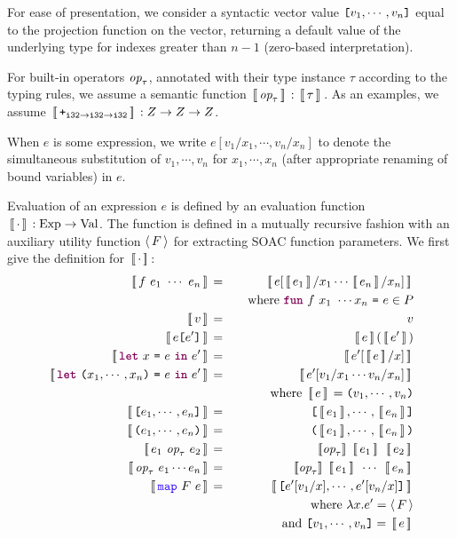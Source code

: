 \documentclass[11pt]{book}
\begin{document}
For ease of presentation, we consider a syntactic vector value $\texttt{[}v_1,\cdots,v_n\texttt{]}$ equal to the projection function on the vector, returning a default value of the underlying type for indexes greater than $n-1$ (zero-based interpretation).

For built-in operators $\mbox{\it{op}}_\tau$, annotated with their type
instance $\tau$ according to the typing rules, we assume a semantic
function $\,[\![\,\mbox{\it{op}}_\tau\,]\!]\, : \,[\![\,\tau\,]\!]\,$. As an examples, we assume
$\,[\![\,\texttt{+}_{\texttt{i32}\rightarrow\texttt{i32}\rightarrow\texttt{i32}}\,]\!]\, : Z \rightarrow Z \rightarrow Z$.

When $e$ is some expression, we write $e[v_1/x_1,\cdots,v_n/x_n]$ to
denote the simultaneous substitution of $v_1,\cdots,v_n$ for
$x_1,\cdots,x_n$ (after appropriate renaming of bound variables) in
$e$.



Evaluation of an expression $e$ is defined by an evaluation function
$\,[\![\,\cdot\,]\!]\, : \mathrm{Exp} \rightarrow \mathrm{Val}$. The function
is defined in a mutually recursive fashion with an auxiliary utility
function $\langle\,F\,\rangle$ for extracting SOAC function parameters. We
first give the definition for $\,[\![\,\cdot\,]\!]\,$:
\begin{eqnarray*}
  \Eval{f~e_1~\cdots~e_n} & = & \Eval{e[\Eval{e_1}/x_1\cdots \Eval{e_n}/x_n]} \\ & & ~~~ \mathrm{where}~\fw{fun}~f~x_1~ \cdots x_n ~\kw{=}~ e \in P \\
  \Eval{v} & = & v \\
  \Eval{e\kw{[}e'\kw{]}} & = & \Eval{e}(\Eval{e'}) \\
  \Eval{\fw{let}~x~\kw{=}~e~\fw{in}~e'} & = & \Eval{e'[\Eval{e}/x]} \\
  \Eval{\fw{let}~\kw{(}x_1,\cdots,x_n\kw{)}~\kw{=}~e~\fw{in}~e'} & = & \Eval{e'[v_1/x_1\cdots v_n/x_n]} \\ & & ~~~ \mathrm{where}~ \Eval{e} = \kw{(}v_1,\cdots,v_n\kw{)} \\
  \Eval{\kw{[}e_1,\cdots,e_n\kw{]}} & = & \kw{[}\Eval{e_1},\cdots,\Eval{e_n}\kw{]} \\
  \Eval{\kw{(}e_1,\cdots,e_n\kw{)}} & = & \kw{(}\Eval{e_1},\cdots,\Eval{e_n}\kw{)} \\
  \Eval{e_1~\id{op}_\tau~e_2} & = & \sem{\id{op}_\tau}~\Eval{e_1}~\Eval{e_2} \\
  \Eval{\id{op}_\tau~e_1\cdots e_n} & = & \sem{\id{op}_\tau}~\Eval{e_1}~\cdots~\Eval{e_n} \\
  \Eval{\fop{map}~F~e} & = & \Eval{\kw{[}e'[v_1/x],\cdots,e'[v_n/x]\kw{]}} \\
    & & ~~~\mathrm{where}~\lambda x . e' = \extractF{F} \\
    & & ~~~~~\mathrm{and}~ \kw{[}v_1,\cdots,v_n\kw{]} = \Eval{e}
\end{eqnarray*}
\end{document}
